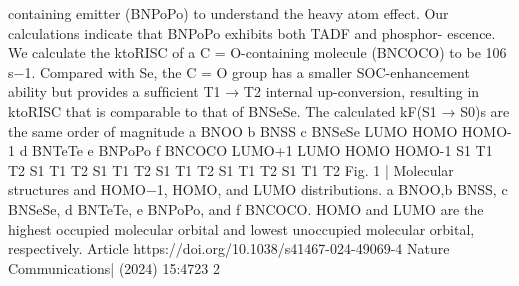 containing emitter (BNPoPo) to understand the heavy atom effect. Our
calculations indicate that BNPoPo exhibits both TADF and phosphor-
escence. We calculate the ktoRISC of a C = O-containing molecule
(BNCOCO) to be 106 s−1. Compared with Se, the C = O group has a
smaller SOC-enhancement ability but provides a sufﬁcient T1 → T2
internal up-conversion, resulting in ktoRISC that is comparable to that of
BNSeSe. The calculated kF(S1 → S0)s are the same order of magnitude
a BNOO
b BNSS
c BNSeSe
LUMO
HOMO
HOMO-1
d BNTeTe
e BNPoPo f BNCOCO
LUMO+1
LUMO
HOMO
HOMO-1
S1 T1
T2
S1 T1
T2
S1 T1
T2
S1 T1
T2
S1 T1
T2
S1 T1
T2
Fig. 1 | Molecular structures and HOMO−1, HOMO, and LUMO distributions.
a BNOO,b BNSS, c BNSeSe, d BNTeTe, e BNPoPo, and f BNCOCO. HOMO and LUMO
are the highest occupied molecular orbital and lowest unoccupied molecular
orbital, respectively.
Article
https://doi.org/10.1038/s41467-024-49069-4
Nature Communications|        (2024) 15:4723 
2


